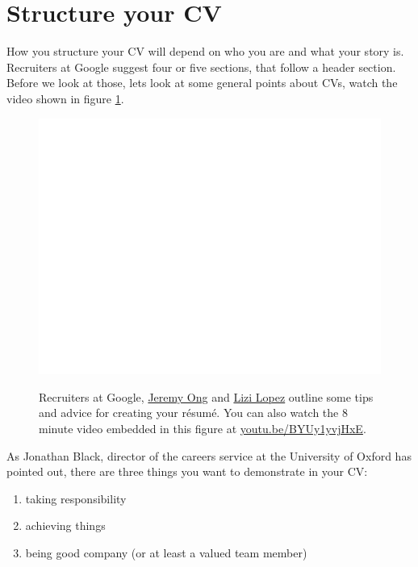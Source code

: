 \documentclass[
]{book}
\providecommand{\tightlist}{%
  \setlength{\itemsep}{0pt}\setlength{\parskip}{0pt}}
\begin{document}
\hypertarget{mycvst}{%
\section{Structure your CV}\label{mycvst}}

How you structure your CV will depend on who you are and what your story is. Recruiters at Google suggest four or five sections, that follow a header section. Before we look at those, lets look at some general points about CVs, watch the video shown in figure \ref{fig:lopez-fig}.

\begin{figure}

{\centering \href{https://www.youtube.com/embed/BYUy1yvjHxE}{\includegraphics[width=0.99\linewidth]{cdyf_files/figure-latex/lopez-fig-1} }

}

\caption{Recruiters at Google, \href{https://www.linkedin.com/in/jeremy-ong/}{Jeremy Ong} and \href{https://www.linkedin.com/in/lizilopez/}{Lizi Lopez} outline some tips and advice for creating your résumé. You can also watch the 8 minute video embedded in this figure at \href{https://youtu.be/BYUy1yvjHxE}{youtu.be/BYUy1yvjHxE}. \citep{youtube-google-recruiters}}\label{fig:lopez-fig}
\end{figure}



As Jonathan Black, director of the careers service at the University of Oxford has pointed out, \citep{topnotchcv} there are three things you want to demonstrate in your CV:

\begin{enumerate}
\def\labelenumi{\arabic{enumi}.}
\tightlist
\item
  taking responsibility
\item
  achieving things
\item
  being good company (or at least a valued team member)
\end{enumerate}
\end{document}
